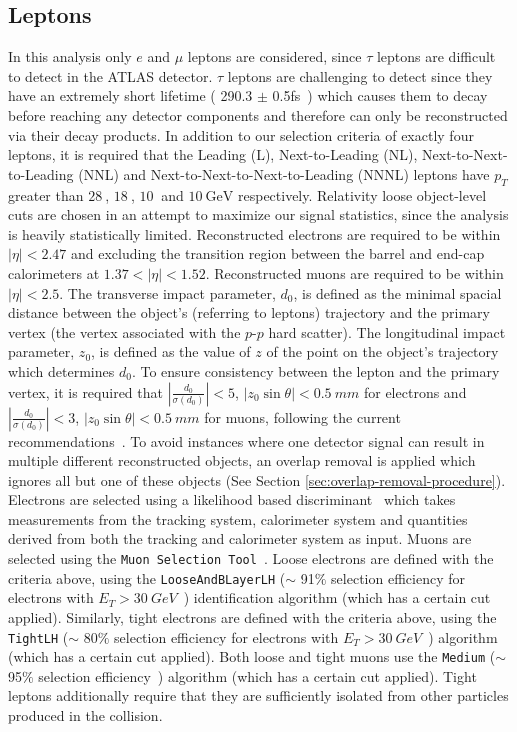 \subsection{Leptons}
\label{sec:lepton-object}
In this analysis only $e$ and $\mu$ leptons are considered, since $\tau$ leptons are difficult to detect in the ATLAS detector. $\tau$ leptons are challenging to detect since they have an extremely short lifetime ( 290.3 $\pm$ 0.5fs~\cite{pdg}) which causes them to decay before reaching any detector components and therefore can only be reconstructed via their decay products. In addition to our selection criteria of exactly four leptons, it is required that the Leading (L), Next-to-Leading (NL), Next-to-Next-to-Leading (NNL) and Next-to-Next-to-Next-to-Leading (NNNL) leptons have $p_{T}$ greater than $\SI{28}{}$, $\SI{18}{}$, $\SI{10}{}$ and $\SI{10}{\GeV}$ respectively. Relativity loose object-level cuts are chosen in an attempt to maximize our signal statistics, since the analysis is heavily statistically limited. Reconstructed electrons are required to be within $|\eta| < 2.47$ and excluding the transition region between the barrel and end-cap calorimeters at $1.37 < |\eta| < 1.52$. Reconstructed muons are required to be within $|\eta| < 2.5$. The transverse impact parameter, $d_{0}$, is defined as the minimal spacial distance between the object's (referring to leptons) trajectory and the primary vertex (the vertex associated with the $p$-$p$ hard scatter). The longitudinal impact parameter, $z_{0}$, is defined as the value of $z$ of the point on the object's trajectory which determines $d_{0}$. To ensure consistency between the lepton and the primary vertex, it is required that $|\frac{d_{0}}{\sigma(d_{0})}| < 5$, $|z_{0}\sin{\theta}| < \SI{0.5}{mm}$ for electrons and $|\frac{d_{0}}{\sigma(d_{0})}| < 3$, $|z_{0}\sin{\theta}| < \SI{0.5}{mm}$ for muons, following the current recommendations~\cite{TopRecoObjTwikiModel}. To avoid instances where one detector signal can result in multiple different reconstructed objects, an overlap removal is applied which ignores all but one of these objects (See Section \ref{sec:overlap-removal-procedure}). Electrons are selected using a likelihood based discriminant~\cite{electronRecoAndID:paper} which takes measurements from the tracking system, calorimeter system and quantities derived from both the tracking and calorimeter system as input. Muons are selected using the \texttt{Muon Selection Tool}~\cite{muon-selection-tool}. Loose electrons are defined with the criteria above, using the \texttt{LooseAndBLayerLH} ($\sim$ 91$\%$ selection efficiency for electrons with $E_{T} > \SI{30}{GeV}$~\cite{electronIDefficiency}) identification algorithm (which has a certain cut applied). Similarly, tight electrons are defined with the criteria above, using the \texttt{TightLH} ($\sim$ 80$\%$ selection efficiency for electrons with $E_{T} > \SI{30}{GeV}$~\cite{electronIDefficiency}) algorithm (which has a certain cut applied). Both loose and tight muons use the \texttt{Medium} ($\sim$ 95$\%$ selection efficiency~\cite{muonIDEfficiency}) algorithm (which has a certain cut applied). Tight leptons additionally require that they are sufficiently isolated from other particles produced in the collision. 